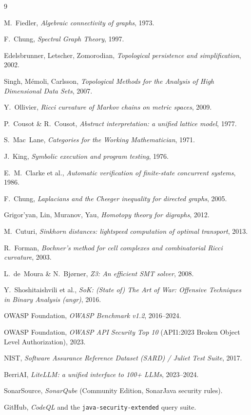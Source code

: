 \documentclass[11pt]{article}
\begin{document}
\begin{thebibliography}{9}
\item M.~Fiedler, \emph{Algebraic connectivity of graphs}, 1973.
\item F.~Chung, \emph{Spectral Graph Theory}, 1997.
\item Edelsbrunner, Letscher, Zomorodian, \emph{Topological persistence and simplification}, 2002.
\item Singh, M\'emoli, Carlsson, \emph{Topological Methods for the Analysis of High Dimensional Data Sets}, 2007.
\item Y.~Ollivier, \emph{Ricci curvature of Markov chains on metric spaces}, 2009.
\item P.~Cousot \& R.~Cousot, \emph{Abstract interpretation: a unified lattice model}, 1977.
\item S.~Mac~Lane, \emph{Categories for the Working Mathematician}, 1971.
\item J.~King, \emph{Symbolic execution and program testing}, 1976.
\item E.~M.~Clarke et al., \emph{Automatic verification of finite-state concurrent systems}, 1986.
\item F.~Chung, \emph{Laplacians and the Cheeger inequality for directed graphs}, 2005.
\item Grigor'yan, Lin, Muranov, Yau, \emph{Homotopy theory for digraphs}, 2012.
\item M.~Cuturi, \emph{Sinkhorn distances: lightspeed computation of optimal transport}, 2013.
\item R.~Forman, \emph{Bochner's method for cell complexes and combinatorial Ricci curvature}, 2003.
\item L.~de~Moura \& N.~Bj\o rner, \emph{Z3: An efficient SMT solver}, 2008.
\item Y.~Shoshitaishvili et al., \emph{SoK: (State of) The Art of War: Offensive Techniques in Binary Analysis (angr)}, 2016.
\item OWASP Foundation, \emph{OWASP Benchmark v1.2}, 2016--2024.
\item OWASP Foundation, \emph{OWASP API Security Top 10} (API1:2023 Broken Object Level Authorization), 2023.
\item NIST, \emph{Software Assurance Reference Dataset (SARD) / Juliet Test Suite}, 2017.
\item BerriAI, \emph{LiteLLM: a unified interface to 100+ LLMs}, 2023--2024.
\item SonarSource, \emph{SonarQube} (Community Edition, SonarJava security rules).
\item GitHub, \emph{CodeQL} and the \texttt{java-security-extended} query suite.
\end{thebibliography}
\end{document}
